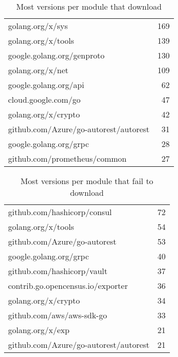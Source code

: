 \begin{table}[ht]
\caption{Most versions per module that  download}
\label{table:versions}
\begin{tabular}{|l|r|}
\hline
 golang.org/x/sys & 169 \\
 golang.org/x/tools & 139 \\
 google.golang.org/genproto & 130 \\
 golang.org/x/net & 109 \\
 google.golang.org/api & 62 \\
 cloud.google.com/go & 47 \\
 golang.org/x/crypto & 42 \\
 github.com/Azure/go-autorest/autorest & 31 \\
 google.golang.org/grpc & 28 \\
 github.com/prometheus/common & 27 \\
\hline
\end{tabular}
\end{table}
\begin{table}[ht]
\caption{Most versions per module that fail to download}
\label{table:failversions}
\begin{tabular}{|l|r|}
\hline
 github.com/hashicorp/consul & 72 \\
 golang.org/x/tools & 54 \\
 github.com/Azure/go-autorest & 53 \\
 google.golang.org/grpc & 40 \\
 github.com/hashicorp/vault & 37 \\
 contrib.go.opencensus.io/exporter & 36 \\
 golang.org/x/crypto & 34 \\
 github.com/aws/aws-sdk-go & 33 \\
 golang.org/x/exp & 21 \\
 github.com/Azure/go-autorest/autorest & 21 \\
\hline
\end{tabular}
\end{table}
